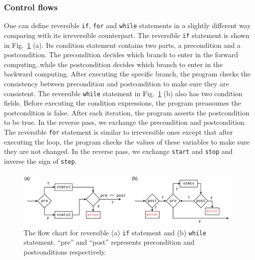 \documentclass{article}
\newcommand{\<}{\langle}
\renewcommand{\>}{\rangle}
\newcommand{\Fig}[1]{Fig.~\ref{#1}}
\theoremstyle{definition}\newtheorem{definition}{\textit{Definition}}
\begin{document}
\subsubsection{Control flows}
One can define reversible \texttt{if}, \texttt{for} and \texttt{while} statements in a slightly different way comparing with its irreversible counterpart. The reversible \texttt{if} statement is shown in \Fig{fig:controlflow} (a). Its condition statement contains two parts, a precondition and a postcondition. The precondition decides which branch to enter in the forward computing, while the postcondition decides which branch to enter in the backward computing. After executing the specific branch, the program checks the consistency between precondition and postcondition to make sure they are consistent.
The reversible \texttt{while} statement in \Fig{fig:controlflow} (b) also has two condition fields. Before executing the condition expressions, the program preassumes the postcondition is false.
After each iteration, the program asserts the postcondition to be true. In the reverse pass, we exchange the precondition and postcondition.
The reversible \texttt{for} statement is similar to irreversible ones except that after executing the loop, the program checks the values of these variables to make sure they are not changed. In the reverse pass, we exchange \texttt{start} and \texttt{stop} and inverse the sign of \texttt{step}.
\begin{figure}
    \centerline{\includegraphics[width=0.9\columnwidth,trim={0 0cm 0 0cm},clip]{controlflow_v2.pdf}}
    \caption{The flow chart for reversible (a) \texttt{if} statement and (b) \texttt{while} statement. ``pre'' and ``post'' represents precondition and postconditions respectively.}\label{fig:controlflow}
\end{figure}
\end{document}

